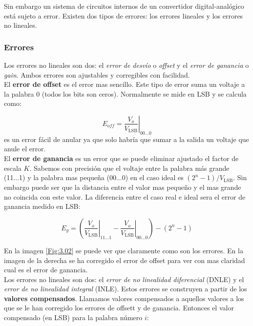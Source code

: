 \documentclass[11pt]{article} %
\newcommand{\parentesis}[1]{\left( #1  \right)}
\newcommand{\LSB}{\mathrm{LSB}}
\begin{document}
Sin embargo un sistema de circuitos internos de un convertidor digital-analógico está sujeto a error. Existen dos tipos de errores: los errores lineales y los errores no lineales. 

\subsubsection{Errores}

Los errores no lineales son dos: el \textit{error de desvío} o \textit{offset} y el \textit{error de ganancia} o \textit{gain}. Ambos errores son ajustables y corregibles con facilidad. \\

El \textbf{error de offset} es el error mas sencillo. Este tipo de error suma un voltaje a la palabra 0 (todos los bits son ceros). Normalmente se mide en LSB y se calcula como:

\begin{equation}
E_{off} = \left. \dfrac{V_o}{V_{\mathrm{LSB}}} \right|_{00 \ldots 0}
\end{equation}
es un error fácil de anular ya que solo habría que sumar a la salida un voltaje que anule el error. \\

El \textbf{error de ganancia} es un error que se puede eliminar ajustado el factor de escala $K$. Sabemos con precisión que el voltaje entre la palabra más grande (11...1) y la palabra mas pequeña (00...0) en el caso ideal es $(2^n-1)/V_\LSB$. Sin embargo puede ser que la distancia entre el valor mas pequeño y el mas grande no coincida con este valor. La diferencia entre el caso real e ideal sera el error de ganancia medido en LSB:

\begin{equation}
E_g = \parentesis{\left. \dfrac{V_o}{V_{\mathrm{LSB}}} \right|_{11 \ldots 1} - \left. \dfrac{V_o}{V_{\mathrm{LSB}}} \right|_{00 \ldots 0}} - (2^n-1)
\end{equation}

En la imagen \ref{Fig:3.02} se puede ver que claramente como son los errores. En la imagen de la derecha se ha corregido el error de offset para ver con mas claridad cual es el error de ganancia. \\

Los errores no lineales son dos: el \textit{error de no linealidad diferencial} (DNLE) y el \textit{error de no linealidad integral} (INLE). Estos errores se construyen a partir de los \textbf{valores compensados}. Llamamos valores compensados a aquellos valores a los que se le han corregido los errores de offsett y de ganancia. Entonces el valor compensado (en LSB) para la palabra número $i$:
\end{document}
